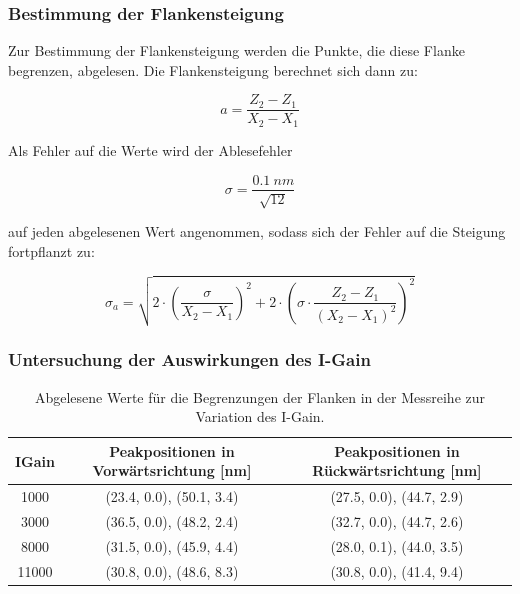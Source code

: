 \documentclass[12pt,a4paper]{article}
\begin{document}
\subsubsection{Bestimmung der Flankensteigung}
Zur Bestimmung der Flankensteigung werden die Punkte, die diese Flanke begrenzen, abgelesen.
Die Flankensteigung berechnet sich dann zu:

\begin{equation*}
a = \dfrac{Z_2 - Z_1}{X_2 - X_1}
\end{equation*}

Als Fehler auf die Werte wird der Ablesefehler

\begin{equation*}
\sigma = \dfrac{\SI{0.1}{nm}}{\sqrt{12}}
\end{equation*}

auf jeden abgelesenen Wert angenommen, sodass sich der Fehler auf die Steigung fortpflanzt zu:

\begin{equation*}
\sigma _a = \sqrt{2 \cdot \left( \dfrac{\sigma}{X_2 - X_1} \right) ^2 + 2 \cdot \left( \sigma \cdot  \dfrac{Z_2 - Z_1}{(X_2 - X_1)^2} \right) ^2}
\end{equation*}


\subsubsection{Untersuchung der Auswirkungen des I-Gain}

\begin{table}
\centering
\begin{tabular}{|c|c|c|}
\hline 
IGain & Peakpositionen in Vorwärtsrichtung [nm] & Peakpositionen in Rückwärtsrichtung [nm] \\ 
\hline 
1000 & (23.4, 0.0), (50.1, 3.4) & (27.5, 0.0), (44.7, 2.9) \\
\hline 
3000 & (36.5, 0.0), (48.2, 2.4) & (32.7, 0.0), (44.7, 2.6) \\ 
\hline 
8000 & (31.5, 0.0), (45.9, 4.4) & (28.0, 0.1), (44.0, 3.5) \\
\hline 
11000 & (30.8, 0.0), (48.6, 8.3) & (30.8, 0.0), (41.4, 9.4) \\
\hline 
\end{tabular} 
\caption{Abgelesene Werte für die Begrenzungen der Flanken in der Messreihe zur Variation des I-Gain.}
\label{tab:Peaks_IGain}
\end{table}
\end{document}
